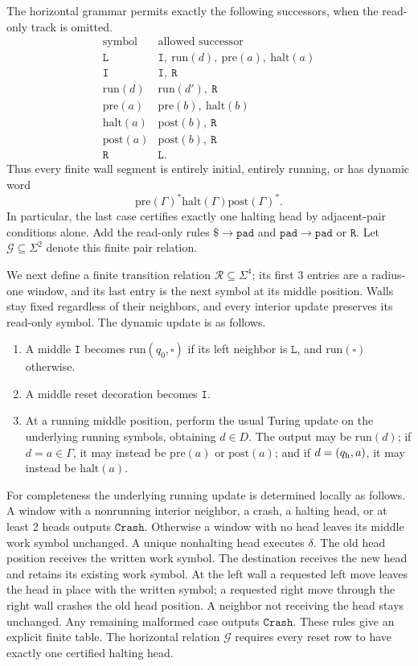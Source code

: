 \documentclass[10pt]{article}
\numberwithin{equation}{section}
\theoremstyle{definition}
\begin{document}
The horizontal grammar permits exactly the following successors, when the read-only track is omitted.
\[
\begin{array}{c|l}
\text{symbol}&\text{allowed successor}\\ \hline
\mathtt L&\mathtt I,\ \mathrm{run}(d),\ \mathrm{pre}(a),\ \mathrm{halt}(a)\\
\mathtt I&\mathtt I,\ \mathtt R\\
\mathrm{run}(d)&\mathrm{run}(d'),\ \mathtt R\\
\mathrm{pre}(a)&\mathrm{pre}(b),\ \mathrm{halt}(b)\\
\mathrm{halt}(a)&\mathrm{post}(b),\ \mathtt R\\
\mathrm{post}(a)&\mathrm{post}(b),\ \mathtt R\\
\mathtt R&\mathtt L.
\end{array}
\]
Thus every finite wall segment is entirely initial, entirely running, or has dynamic word
\[
 \mathrm{pre}(\Gamma)^*\mathrm{halt}(\Gamma)\mathrm{post}(\Gamma)^*.
\]
In particular, the last case certifies exactly one halting head by adjacent-pair conditions alone. Add the read-only rules $\mathtt\$\to\mathtt{pad}$ and $\mathtt{pad}\to\mathtt{pad}$ or $\mathtt R$. Let $\mathcal G\subseteq\Sigma^2$ denote this finite pair relation.

We next define a finite transition relation $\mathcal R\subseteq\Sigma^4$; its first 3 entries are a radius-one window, and its last entry is the next symbol at its middle position. Walls stay fixed regardless of their neighbors, and every interior update preserves its read-only symbol. The dynamic update is as follows.
\begin{enumerate}
\item A middle $\mathtt I$ becomes $\mathrm{run}(q_0,\square)$
if its left neighbor is $\mathtt L$, and $\mathrm{run}(\square)$ otherwise.
\item A middle reset decoration becomes $\mathtt I$.
\item At a running middle position, perform the usual Turing update
on the underlying running symbols, obtaining $d\in D$. The output may be $\mathrm{run}(d)$; if $d=a\in\Gamma$, it may instead be $\mathrm{pre}(a)$ or $\mathrm{post}(a)$; and if $d=(q_{\rm h},a)$, it may instead be $\mathrm{halt}(a)$.
\end{enumerate}
For completeness the underlying running update is determined locally as follows. A window with a nonrunning interior neighbor, a crash, a halting head, or at least 2 heads outputs $\mathtt{Crash}$. Otherwise a window with no head leaves its middle work symbol unchanged. A unique nonhalting head executes $\delta$. The old head position receives the written work symbol. The destination receives the new head and retains its existing work symbol. At the left wall a requested left move leaves the head in place with the written symbol; a requested right move through the right wall crashes the old head position. A neighbor not receiving the head stays unchanged. Any remaining malformed case outputs $\mathtt{Crash}$. These rules give an explicit finite table. The horizontal relation $\mathcal G$ requires every reset row to have exactly one certified halting head.
\end{document}
